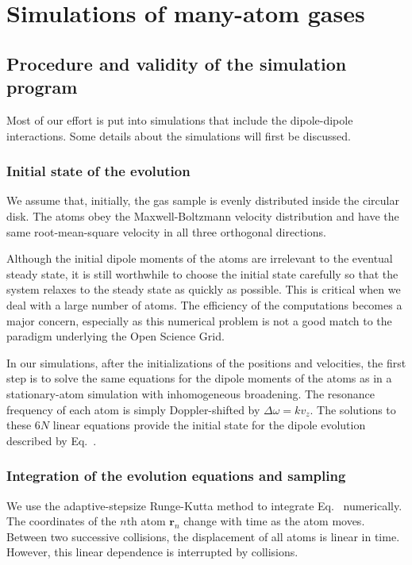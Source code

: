 \section{Simulations of many-atom gases}
\subsection{Procedure and validity of the simulation program}

Most of our effort is put into simulations that include the dipole-dipole interactions. Some details about the simulations will first be discussed. 

\subsubsection{Initial state of the evolution}

We assume that, initially, the gas sample is evenly distributed inside the circular disk. The atoms obey the Maxwell-Boltzmann velocity distribution and have the same root-mean-square velocity in all three orthogonal directions.

Although the initial dipole moments of the atoms are irrelevant to the eventual steady state, it is still worthwhile to choose the initial state carefully so that the system relaxes to the steady state as quickly as possible. This is critical when we deal with a large number of atoms. The efficiency of the computations becomes a major concern, especially as this numerical problem is not a good match to the paradigm underlying the Open Science Grid.

In our simulations, after the initializations of the positions and velocities, the first step is to solve the same equations for the dipole moments of the atoms as in a stationary-atom simulation with inhomogeneous broadening. The resonance frequency of each atom is simply Doppler-shifted by $\Delta\omega=kv_z$. The solutions to these $6N$ linear equations provide the initial state for the dipole evolution described by Eq.~.

\subsubsection{Integration of the evolution equations and sampling}

We use the adaptive-stepsize Runge-Kutta method to integrate Eq.~ numerically. The coordinates of the $n$th atom $\mathbf{r}_n$ change with time as the atom moves. Between two successive collisions, the displacement of all atoms is linear in time. However, this linear dependence is interrupted by collisions.

